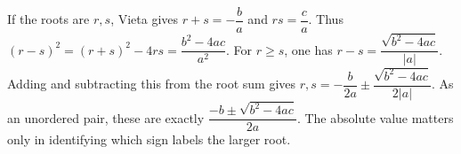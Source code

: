 If the roots are $r,s$, Vieta gives $r+s=-\dfrac{b}{a}$ and $rs=\dfrac{c}{a}$. Thus $(r-s)^2=(r+s)^2-4rs=\dfrac{b^2-4ac}{a^2}$. For $r\ge s$, one has $r-s=\dfrac{\sqrt{b^2-4ac}}{|a|}$. Adding and subtracting this from the root sum gives $r,s=-\dfrac{b}{2a}\pm\dfrac{\sqrt{b^2-4ac}}{2|a|}$. As an unordered pair, these are exactly $\boxed{\dfrac{-b\pm\sqrt{b^2-4ac}}{2a}}$. The absolute value matters only in identifying which sign labels the larger root.
